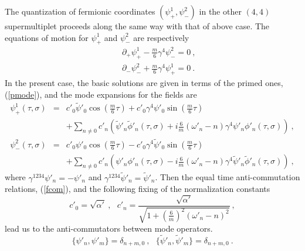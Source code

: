 \documentclass[a4paper,12pt]{article}
\begin{document}
The quantization of fermionic coordinates $(\psi^1_+, \psi^2_-)$ in
the other $(4,4)$ supermultiplet proceeds along the same way with that
of above case.  The equations of motion for $\psi^1_+$ and $\psi^2_-$
are respectively
\begin{eqnarray}
& & \partial_+ \psi^1_+ - \frac{m}{6} \gamma^4 \psi^2_- = 0 ~,
                                      \nonumber \\
& & \partial_- \psi^2_- + \frac{m}{6} \gamma^4 \psi^1_+ = 0 ~.
\label{fpeom}
\end{eqnarray}
In the present case, the basic solutions are given in terms of the
primed ones, (\ref{pmode}), and the mode expansions for the fields are
\begin{eqnarray}
\psi^1_+ (\tau, \sigma) 
 &=& c'_0 \tilde{\psi}'_0 \cos \left( \frac{m}{6} \tau \right) 
     + c'_0 \gamma^4 \psi'_0 \sin \left( \frac{m}{6} \tau \right) 
                              \nonumber \\
 & & + \sum_{n \neq 0} c'_n 
      \left( 
         \tilde{\psi}'_n \tilde{\phi}'_n (\tau, \sigma)
         + i \frac{6}{m} (\omega'_n - n) 
            \gamma^4 \psi'_n \phi'_n (\tau, \sigma ) 
      \right)~,
                               \nonumber \\
\psi^2_- (\tau, \sigma) 
 &=& c'_0 \psi'_0 \cos \left( \frac{m}{6} \tau \right) 
     - c'_0 \gamma^4 \tilde{\psi}'_0 
        \sin \left( \frac{m}{6} \tau \right) 
                              \nonumber \\
 & & + \sum_{n \neq 0} c'_n 
      \left( 
         \psi'_n \phi'_n (\tau, \sigma)
         - i \frac{6}{m} (\omega'_n - n) 
            \gamma^4 \tilde{\psi}'_n \tilde{\phi}'_n (\tau, \sigma ) 
      \right)~,
\label{fpmode}
\end{eqnarray}
where $\gamma^{1234} \psi'_n = -\psi'_n$ and $\gamma^{1234}
\tilde{\psi}'_n = \tilde{\psi}'_n$.  Then the equal time
anti-commutation relations, (\ref{fcom}), and the following fixing of
the normalization constants
\[
c'_0 = \sqrt{\alpha'}~,~~~
c'_n = \frac{\sqrt{\alpha'}}{\sqrt{1 + 
          \left( \frac{6}{m} \right)^2 (\omega'_n - n)^2 } }~,
\]
lead us to the anti-commutators between mode operators.
\begin{equation}
\{ \psi'_n , \psi'_m \} = \delta_{n+m,0} ~,~~~
\{ \tilde{\psi}'_n, \tilde{\psi}'_m \} = \delta_{n+m,0}~.
\label{fpmcom}
\end{equation}
\end{document}
